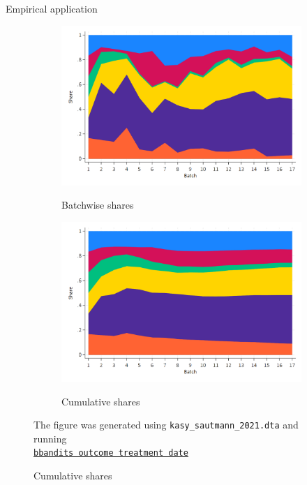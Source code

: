 \documentclass[11pt,table]{beamer}
\begin{document}
\begin{frame}{Empirical application \citep{Kasy2021}}


\begin{figure}[h]
\begin{center}
	\begin{subfigure}[t]{0.49\textwidth}
{\includegraphics[width=1\textwidth]{figures/StackedShareArmSelected_kasy_sautmann.png}}
            \caption{Batchwise shares}
           \label{fig:Batchwise shares Kasy}		
  \end{subfigure}%
	\begin{subfigure}[t]{0.49\textwidth}
{\includegraphics[width=1\textwidth]{figures/CumSharesByBatch_kasy_sautmann.png}}
          \caption{Cumulative shares}
           \label{fig:Cumulative shares Kasy}	
  \end{subfigure}   
\end{center}
\vspace*{1ex}
\raggedleft\footnotesize The figure was generated using \texttt{kasy\_sautmann\_2021.dta} and running\\  \href{https://rostam-afschar.de/bbandits/bbandits.htm}{\texttt{bbandits outcome treatment date}}
\vspace*{-4.5ex}
\end{figure}

\end{frame}
\end{document}
